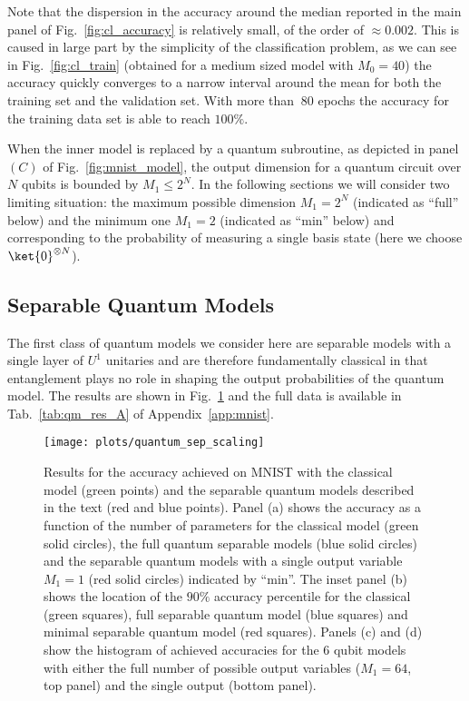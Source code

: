 Note that the dispersion in the accuracy around the median reported in the main panel of Fig.~\ref{fig:cl_accuracy} is relatively small, of the order of $\approx0.002$. This is caused in large part by the simplicity of the classification problem, as we can see in Fig.~\ref{fig:cl_train} (obtained for a medium sized model with $M_0=40$) the accuracy quickly converges to a narrow interval around the mean for both the training set and the validation set. With more than $~80$ epochs the accuracy for the training data set is able to reach $100\%$.

When the inner model is replaced by a quantum subroutine, as depicted in panel $(C)$ of Fig.~\ref{fig:mnist_model}, the output dimension for a quantum circuit over $N$ qubits is bounded by $M_1\leq2^{N}$. In the following sections we will consider two limiting situation: the maximum possible dimension $M_1=2^{N}$ (indicated as ``full'' below) and the minimum one $M_1=2$ (indicated as ``min'' below) and corresponding to the probability of measuring a single basis state (here we choose $\ket{0}^{\otimes N}$).

\subsection{Separable Quantum Models}

The first class of quantum models we consider here are separable models with a single layer of $U^1$ unitaries and are therefore fundamentally classical in that entanglement plays no role in shaping the output probabilities of the quantum model. The results are shown in Fig.~\ref{fig:qm_sep_accuracy} and the full data is available in Tab.~\ref{tab:qm_res_A} of Appendix~\ref{app:mnist}.

\begin{figure}[]
	\centering
	 \texttt{[image: plots/quantum\_sep\_scaling]}
	\caption{ Results for the accuracy achieved on MNIST with the classical model (green points) and the separable quantum models described in the text (red and blue points). Panel (a) shows the accuracy as a function of the number of parameters for the classical model (green solid circles), the full quantum separable models (blue solid circles) and the separable quantum models with a single output variable $M_1=1$ (red solid circles) indicated by ``min''. The inset panel (b) shows the location of the $90\%$ accuracy percentile for the classical (green squares), full separable quantum model (blue squares) and minimal separable quantum model (red squares). Panels (c) and (d) show the histogram of achieved accuracies for the 6 qubit models with either the full number of possible output variables ($M_1=64$, top panel) and the single output (bottom panel).  }
	\label{fig:qm_sep_accuracy}
\end{figure}

